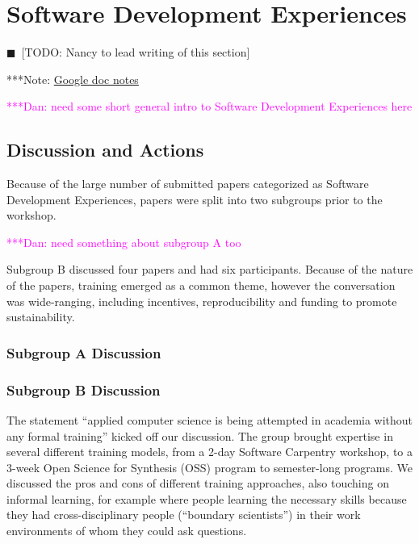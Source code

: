 \documentclass[11pt, oneside]{amsart}
\newcommand{\todo}[1]{{\color{blue}$\blacksquare$~\textsf{[TODO: #1]}}}
\newcommand{\note}[1]{ {\textcolor{blueish}    { ***Note:      #1 }}}
\newcommand{\katznote}[1]{ {\textcolor{magenta}    { ***Dan:      #1 }}}
\begin{document}
\section{Software Development Experiences} \label{sec:devel}
\todo{Nancy to lead writing of this section}

\note{\href{http://tinyurl.com/pn4eq8z}{Google doc notes}}


\katznote{need some short general intro to Software Development Experiences here}
 
\subsection{Discussion and Actions}

Because of the large number of submitted papers categorized as Software
Development Experiences, papers were split into two subgroups prior to the
workshop. 

\katznote{need something about subgroup A too}

Subgroup B discussed four papers and had six
participants. Because of the nature of the papers, training emerged as a
common theme, however the conversation was wide-ranging, including
incentives, reproducibility and funding to promote sustainability.

\subsubsection{Subgroup A Discussion}

\subsubsection{Subgroup B Discussion}
The statement ``applied computer science is being attempted in academia
without any formal training'' kicked off our discussion. The group brought
expertise in several different training models, from a 2-day Software
Carpentry workshop, to a 3-week Open Science for Synthesis (OSS) program
to semester-long programs. We discussed the pros and cons of different
training approaches, also touching on informal learning, for example where
people learning the necessary skills because they had cross-disciplinary
people (``boundary scientists'') in their work environments of whom they
could ask questions.
\end{document}
